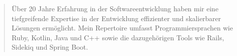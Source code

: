 \begin{minipage}{\linewidth}
\begin{quote}
Über 20 Jahre Erfahrung in der Softwareentwicklung haben mir eine tiefgreifende Expertise in der Entwicklung effizienter und skalierbarer Lösungen ermöglicht. Mein Repertoire umfasst  Programmiersprachen wie Ruby, Kotlin, Java und C++ sowie die dazugehörigen Tools wie Rails, Sidekiq und Spring Boot.
\end{quote}
\end{minipage}
